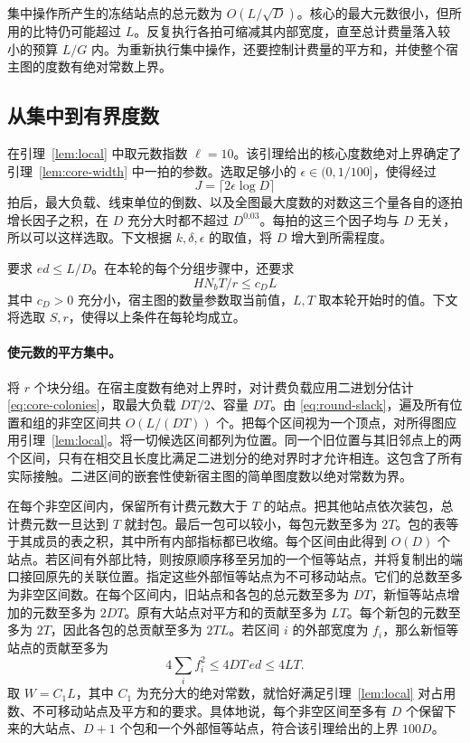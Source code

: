 集中操作所产生的冻结站点的总元数为 $O(L/\sqrt D)$。核心的最大元数很小，但所用的比特仍可能超过 $L$。反复执行各拍可缩减其内部宽度，直至总计费量落入较小的预算 $L/G$ 内。为重新执行集中操作，还要控制计费量的平方和，并使整个宿主图的度数有绝对常数上界。

\subsection{从集中到有界度数} 在引理~\ref{lem:local} 中取元数指数 $\ell=10$。该引理给出的核心度数绝对上界确定了引理~\ref{lem:core-width} 中一拍的参数。选取足够小的 $\epsilon\in(0,1/100]$，使得经过 \[
 J=\lceil2\epsilon\log D\rceil
\] 拍后，最大负载、线束单位的倒数、以及全图最大度数的对数这三个量各自的逐拍增长因子之积，在 $D$ 充分大时都不超过 $D^{0.03}$。每拍的这三个因子均与 $D$ 无关，所以可以这样选取。下文根据 $k,\delta,\epsilon$ 的取值，将 $D$ 增大到所需程度。

要求 $ed\le L/D$。在本轮的每个分组步骤中，还要求 \begin{equation}\label{eq:round-slack}
  H N_b T/r\le c_D L
\end{equation} 其中 $c_D>0$ 充分小，宿主图的数量参数取当前值，$L,T$ 取本轮开始时的值。下文将选取 $S,r$，使得以上条件在每轮均成立。

\paragraph{使元数的平方集中。} 将 $r$ 个块分组。在宿主度数有绝对上界时，对计费负载应用二进划分估计 \eqref{eq:core-colonies}，取最大负载 $DT/2$、容量 $DT$。由 \eqref{eq:round-slack}，遍及所有位置和组的非空区间共 $O(L/(DT))$ 个。把每个区间视为一个顶点，对所得图应用引理~\ref{lem:local}。将一切候选区间都列为位置。同一个旧位置与其旧邻点上的两个区间，只有在相交且长度比满足二进划分的绝对界时才允许相连。这包含了所有实际接触。二进区间的嵌套性使新宿主图的简单图度数以绝对常数为界。

在每个非空区间内，保留所有计费元数大于 $T$ 的站点。把其他站点依次装包，总计费元数一旦达到 $T$ 就封包。最后一包可以较小，每包元数至多为 $2T$。包的表等于其成员的表之积，其中所有内部指标都已收缩。每个区间由此得到 $O(D)$ 个站点。若区间有外部比特，则按原顺序移至另加的一个恒等站点，并将复制出的端口接回原先的关联位置。指定这些外部恒等站点为不可移动站点。它们的总数至多为非空区间数。在每个区间内，旧站点和各包的总元数至多为 $DT$，新恒等站点增加的元数至多为 $2DT$。原有大站点对平方和的贡献至多为 $LT$。每个新包的元数至多为 $2T$，因此各包的总贡献至多为 $2TL$。若区间 $i$ 的外部宽度为 $f_i$，那么新恒等站点的贡献至多为 \[
 4\sum_i f_i^2\le 4DT\,ed\le 4LT .
\] 取 $W=C_1L$，其中 $C_1$ 为充分大的绝对常数，就恰好满足引理~\ref{lem:local} 对占用数、不可移动站点及平方和的要求。具体地说，每个非空区间至多有 $D$ 个保留下来的大站点、$D+1$ 个包和一个外部恒等站点，符合该引理给出的上界 $100D$。


